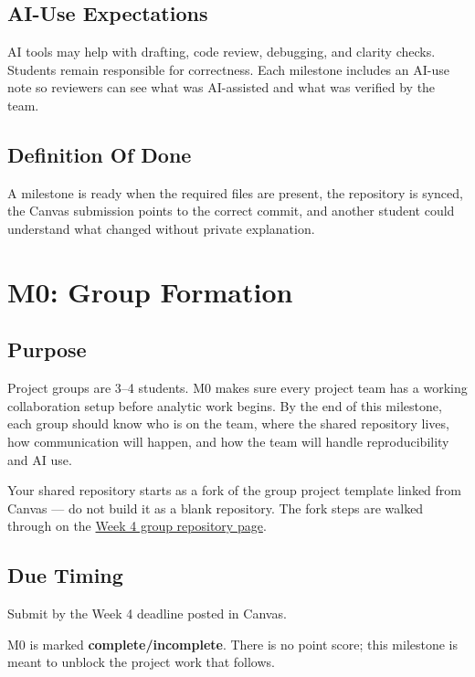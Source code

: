\documentclass[
  letterpaper,
  DIV=11,
  numbers=noendperiod,
  oneside]{scrreprt}
\begin{document}
\section{AI-Use Expectations}\label{ai-use-expectations-10}

AI tools may help with drafting, code review, debugging, and clarity
checks. Students remain responsible for correctness. Each milestone
includes an AI-use note so reviewers can see what was AI-assisted and
what was verified by the team.

\section{Definition Of Done}\label{definition-of-done-20}

A milestone is ready when the required files are present, the repository
is synced, the Canvas submission points to the correct commit, and
another student could understand what changed without private
explanation.

\chapter{M0: Group Formation}\label{m0-group-formation}

\section{Purpose}\label{purpose-13}

Project groups are 3--4 students. M0 makes sure every project team has a
working collaboration setup before analytic work begins. By the end of
this milestone, each group should know who is on the team, where the
shared repository lives, how communication will happen, and how the team
will handle reproducibility and AI use.

Your shared repository starts as a fork of the group project template
linked from Canvas --- do not build it as a blank repository. The fork
steps are walked through on the
\hyperref[setting-up-your-group-repository]{Week 4 group repository
page}.

\section{Due Timing}\label{due-timing}

Submit by the Week 4 deadline posted in Canvas.

\begin{tcolorbox}[enhanced jigsaw, title=\textcolor{quarto-callout-note-color}{\faInfo}\hspace{0.5em}{How M0 is graded}, arc=.35mm, toptitle=1mm, colframe=quarto-callout-note-color-frame, toprule=.15mm, leftrule=.75mm, bottomtitle=1mm, opacityback=0, bottomrule=.15mm, coltitle=black, breakable, opacitybacktitle=0.6, titlerule=0mm, colback=white, left=2mm, colbacktitle=quarto-callout-note-color!10!white, rightrule=.15mm]

M0 is marked \textbf{complete/incomplete}. There is no point score; this
milestone is meant to unblock the project work that follows.

\end{tcolorbox}
\end{document}
